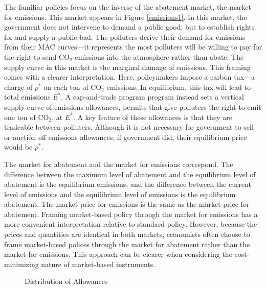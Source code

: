 The familiar policies focus on the inverse of the abatement market, the market for emissions. This market appears in Figure \ref{emissions1}. In this market, the government does not intervene to demand a public good, but to establish rights for and supply a public bad. The polluters derive their demand for emissions from their MAC curves---it represents the most polluters will be willing to pay for the right to send CO$_2$ emissions into the atmosphere rather than abate. The supply curve in this market is the marginal damage of emissions. This framing comes with a clearer interpretation. Here, policymakers impose a carbon tax---a charge of $p^*$ on each ton of CO$_2$ emissions. In equilibrium, this tax will lead to total emissions $E^*$. A cap-and-trade program program instead sets a vertical supply curve of emissions allowances, permits that give polluters the right to emit one ton of CO$_2$, at $E^*$. A key feature of these allowances is that they are tradeable between polluters. Although it is not necessary for government to sell or auction off emissions allowances, if government did, their equilibrium price would be $p^*$. 

The market for abatement and the market for emissions correspond. The difference between the maximum level of abatement and the equilibrium level of abatement is the equilibrium emissions, and the difference between the current level of emissions and the equilibrium level of emissions is the equilibrium abatement. The market price for emissions is the same as the market price for abatement. Framing market-based policy through the market for emissions has a more convenient interpretation relative to standard policy. However, because the prices and quantities are identical in both markets, economists often choose to frame market-based polices through the market for abatement rather than the market for emissions. This approach can be clearer when considering the cost-minimizing nature of market-based instruments.

\begin{figure}
\caption{Distribution of Allowances \label{dist_allowance}}
\centering
{}
\end{figure}

